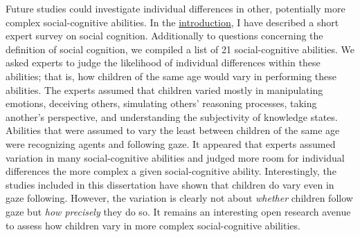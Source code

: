 \documentclass[
]{scrbook}
\begin{document}
Future studies could investigate individual differences in other, potentially more complex social-cognitive abilities. In the \hyperref[introduction]{introduction}, I have described a short expert survey on social cognition. Additionally to questions concerning the definition of social cognition, we compiled a list of 21 social-cognitive abilities. We asked experts to judge the likelihood of individual differences within these abilities; that is, how children of the same age would vary in performing these abilities. The experts assumed that children varied mostly in manipulating emotions, deceiving others, simulating others' reasoning processes, taking another's perspective, and understanding the subjectivity of knowledge states. Abilities that were assumed to vary the least between children of the same age were recognizing agents and following gaze. It appeared that experts assumed variation in many social-cognitive abilities and judged more room for individual differences the more complex a given social-cognitive ability. Interestingly, the studies included in this dissertation have shown that children do vary even in gaze following. However, the variation is clearly not about \emph{whether} children follow gaze but \emph{how precisely} they do so. It remains an interesting open research avenue to assess how children vary in more complex social-cognitive abilities.
\end{document}
